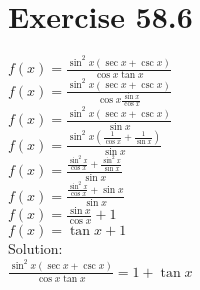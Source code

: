 \documentclass[a4paper, 10pt]{scrartcl}
\begin{document}
\section{Exercise 58.6}

$f(x) = \frac{\sin^{2}{x}(\sec{x} + \csc{x})}{\cos{x}\tan{x}}$\\
$f(x) = \frac{\sin^{2}{x}(\sec{x} + \csc{x})}{\cos{x}\frac{\sin{x}}{\cos{x}}}$\\
$f(x) = \frac{\sin^{2}{x}(\sec{x} + \csc{x})}{\sin{x}}$\\
$f(x) = \frac{\sin^{2}{x}(\frac{1}{\cos{x}} + \frac{1}{\sin{x}})}{\sin{x}}$\\
$f(x) = \frac{\frac{\sin^{2}{x}}{\cos{x}} + \frac{\sin^{2}{x}}{\sin{x}}}{\sin{x}}$\\
$f(x) = \frac{\frac{\sin^{2}{x}}{\cos{x}} + \sin{x}}{\sin{x}}$\\
$f(x) = \frac{\sin{x}}{\cos{x}} + 1$\\
$f(x) = \tan{x} + 1$\\

Solution:\\
$\frac{\sin^{2}{x}(\sec{x} + \csc{x})}{\cos{x}\tan{x}} = 1 + \tan{x}$\\
\end{document}
